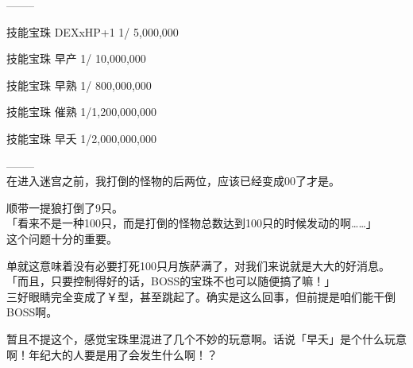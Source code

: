   --------

  技能宝珠  DEXxHP+1 1/    5,000,000

  技能宝珠      早产 1/   10,000,000

  技能宝珠      早熟  1/  800,000,000

  技能宝珠      催熟 1/1,200,000,000

  技能宝珠      早夭 1/2,000,000,000

  --------\\

在进入迷宫之前，我打倒的怪物的后两位，应该已经变成00了才是。

顺带一提狼打倒了9只。\\

「看来不是一种100只，而是打倒的怪物总数达到100只的时候发动的啊……」\\

这个问题十分的重要。

单就这意味着没有必要打死100只月族萨满了，对我们来说就是大大的好消息。\\

「而且，只要控制得好的话，BOSS的宝珠不也可以随便搞了嘛！」\\

三好眼睛完全变成了￥型，甚至跳起了。确实是这么回事，但前提是咱们能干倒BOSS啊。

暂且不提这个，感觉宝珠里混进了几个不妙的玩意啊。话说「早夭」是个什么玩意啊！年纪大的人要是用了会发生什么啊！？\\

